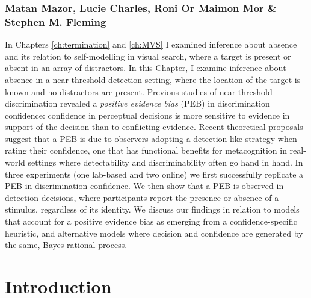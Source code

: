 \documentclass[12pt,twoside]{reedthesis}
\begin{document}
\hypertarget{matan-mazor-lucie-charles-roni-or-maimon-mor-stephen-m.-fleming}{%
\subsubsection*{Matan Mazor, Lucie Charles, Roni Or Maimon Mor \& Stephen M. Fleming}\label{matan-mazor-lucie-charles-roni-or-maimon-mor-stephen-m.-fleming}}

In Chapters \ref{ch:termination} and \ref{ch:MVS} I examined inference about absence and its relation to self-modelling in visual search, where a target is present or absent in an array of distractors. In this Chapter, I examine inference about absence in a near-threshold detection setting, where the location of the target is known and no distractors are present. Previous studies of near-threshold discrimination revealed a \emph{positive evidence bias} (PEB) in discrimination confidence: confidence in perceptual decisions is more sensitive to evidence in support of the decision than to conflicting evidence. Recent theoretical proposals suggest that a PEB is due to observers adopting a detection-like strategy when rating their confidence, one that has functional benefits for metacognition in real-world settings where detectability and discriminability often go hand in hand. In three experiments (one lab-based and two online) we first successfully replicate a PEB in discrimination confidence. We then show that a PEB is observed in detection decisions, where participants report the presence or absence of a stimulus, regardless of its identity. We discuss our findings in relation to models that account for a positive evidence bias as emerging from a confidence-specific heuristic, and alternative models where decision and confidence are generated by the same, Bayes-rational process.

\hypertarget{introduction-3}{%
\section{Introduction}\label{introduction-3}}
\end{document}
